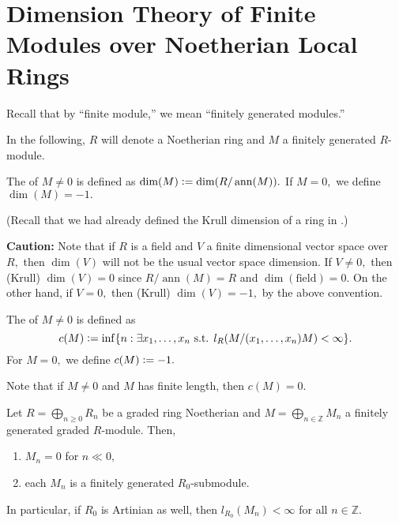 \documentclass[12pt]{article}	%
\DeclareMathOperator{\ann}{ann}
\begin{document}
\section{Dimension Theory of Finite Modules over Noetherian Local Rings}
Recall that by ``finite module,'' we mean ``finitely generated modules.''

In the following, $R$ will denote a Noetherian ring and $M$ a finitely generated $R$-module.

\begin{defn}%
	The  of $M \neq 0$ is defined as $\dim(M) \vcentcolon= \dim(R/\ann(M)).$ If $M = 0,$ we define $\dim(M) = -1.$
\end{defn}
(Recall that we had already defined the Krull dimension of a ring in .)

\begin{disc}
	{\color{red}\textbf{Caution:}} Note that if $R$ is a field and $V$ a finite dimensional vector space over $R,$ then $\dim(V)$ will {\color{red}not} be the usual vector space dimension. If $V \neq 0,$ then (Krull) $\dim(V) = 0$ since $R/\ann(M) = R$ and $\dim(\text{field}) = 0.$ On the other hand, if $V = 0,$ then (Krull) $\dim(V) = -1,$ by the above convention.
\end{disc}

\begin{defn}%
	The  of $M \neq 0$ is defined as
	\begin{equation*} 
		c(M) \vcentcolon= \inf \{n : \exists x_1, \ldots, x_n \text{ s.t. } l_R(M/(x_1, \ldots, x_n)M) < \infty\}.
	\end{equation*}	
	For $M = 0,$ we define $c(M) \vcentcolon= -1.$
\end{defn}

Note that if $M \neq 0$ and $M$ has finite length, then $c(M) = 0.	$

\begin{prop}
	Let $R = \bigoplus_{n \ge 0}R_n$ be a graded ring Noetherian and $M = \bigoplus_{n \in \mathbb{Z}}M_n$ a finitely generated graded $R$-module. Then,
	\begin{enumerate}
		\item $M_n = 0$ for $n \ll 0,$
		\item each $M_n$ is a finitely generated $R_0$-submodule.
	\end{enumerate}
	In particular, if $R_0$ is Artinian as well, then $l_{R_0}(M_n) < \infty$ for all $n \in \mathbb{Z}.$
\end{prop}
\end{document}
